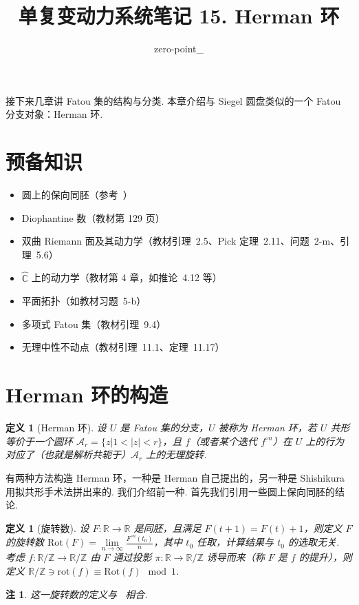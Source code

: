 \documentclass[11pt, a4paper, oneside]{ctexart}
\title{单复变动力系统笔记 15. Herman 环}
\author{zero-point\_}
\newtheorem{definition}[theorem]{定义}
\newtheorem{remark}[theorem]{注}
\newcommand{\C}{\mathbb{C}}
\newcommand{\R}{\mathbb{R}}
\newcommand{\Z}{\mathbb{Z}}
\newcommand{\cA}{\mathcal{A}}
\newcommand{\Rot}{\mathrm{Rot}}
\newcommand{\rot}{\mathrm{rot}}
\newcommand{\abs}[1]{\left|{#1}\right|}
\begin{document}
	\maketitle

    接下来几章讲 Fatou 集的结构与分类. 本章介绍与 Siegel 圆盘类似的一个 Fatou 分支对象：Herman 环.

    \section{预备知识}
    \begin{itemize}
        \item 圆上的保向同胚（参考~\cite[第 11 章]{KH95}）
        \item Diophantine 数（教材第 129 页）
        \item 双曲 Riemann 面及其动力学（教材引理~2.5、Pick 定理~2.11、问题~2-m、引理~5.6）
        \item $\hat{\C}$ 上的动力学（教材第 4 章，如推论~4.12 等）
        \item 平面拓扑（如教材习题~5-b）
        \item 多项式 Fatou 集（教材引理~9.4）
        \item 无理中性不动点（教材引理~11.1、定理~11.17）
    \end{itemize}

    \section{Herman 环的构造}
    \begin{definition}[Herman 环]
        设 $U$ 是 Fatou 集的分支，$U$ 被称为 Herman 环，若 $U$ 共形等价于一个圆环 $\cA_r=\{z|1<\abs{z}<r\}$，且 $f$（或者某个迭代 $f^{\circ n}$）在 $U$ 上的行为对应了（也就是解析共轭于）$\cA_r$ 上的无理旋转. 
    \end{definition}
    有两种方法构造 Herman 环，一种是 Herman 自己提出的，另一种是 Shishikura 用拟共形手术法拼出来的. 我们介绍前一种. 首先我们引用一些圆上保向同胚的结论.

    \begin{definition}[旋转数]
        设 $F:\R\to \R$ 是同胚，且满足 $F(t+1)=F(t)+1$，则定义 $F$ 的旋转数 $\Rot(F)=\lim\limits_{n\to\infty}\frac{F^{\circ n}(t_0)}{n}$，其中 $t_0$ 任取，计算结果与 $t_0$ 的选取无关. 考虑 $f:\R/\Z\to \R/\Z$ 由 $F$ 通过投影 $\pi:\R\to \R/\Z$ 诱导而来（称 $F$ 是 $f$ 的提升），则定义 $\R/\Z\ni\rot(f)\equiv \Rot(f)\mod 1$.
    \end{definition}
    \begin{remark}
        这一旋转数的定义与~\cite[定义 11.1.2]{KH95} 相合.
    \end{remark}
\end{document}
